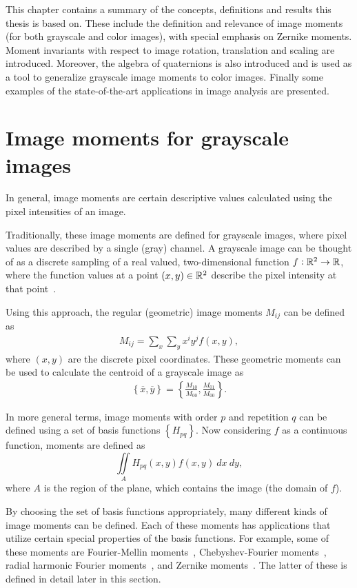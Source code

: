 This chapter contains a summary of the concepts, definitions and results this thesis is based on. These include the definition and relevance of image moments (for both grayscale and color images), with special emphasis on Zernike moments. Moment invariants with respect to image rotation, translation and scaling are introduced.
Moreover, the algebra of quaternions is also introduced and is used as a tool to generalize grayscale image moments to color images.
Finally some examples of the state-of-the-art applications in image analysis are presented.

\section{Image moments for grayscale images}\label{sec:grayscale}
In general, image moments are certain descriptive values calculated using the pixel intensities of an image. 

Traditionally, these image moments are defined for grayscale images, where pixel values are described by a single (gray) channel. A grayscale image can be thought of as a discrete sampling of a real valued, two-dimensional function $f : \mathbb{R}^2 \rightarrow \mathbb{R}$, where the function values at a point $(x,y) \in \mathbb{R}^2$ describe the pixel intensity at that point~\cite{moment_book}.

Using this approach, the regular (geometric) image moments $M_{ij}$ can be defined as
\begin{gather} \label{eq:regular_moment}
M_{ij} = \sum_x \sum_y x^iy^jf(x,y),
\end{gather} where $(x,y)$ are the discrete pixel coordinates.
These geometric moments can be used to calculate the centroid of a grayscale image as 
\begin{gather} \label{eq:centroid}
\left\{ \overline{x}, \overline{y} \right\} = \left\{ \frac{M_{10}}{M_{00}},  \frac{M_{01}}{M_{00}} \right\}.
\end{gather}

In more general terms, image moments with order $p$ and repetition $q$ can be defined using a set of basis functions $\left\{H_{pq}\right\}$. Now considering $f$ as a continuous function, moments are defined as
\begin{equation}\label{GeneralMoments}
\iint\limits_A H_{pq}(x,y)f(x,y)\ dx\ dy,
\end{equation} where $A$ is the region of the plane, which contains the image (the domain of $f$).

By choosing the set of basis functions appropriately, many different kinds of image moments can be defined. Each of these moments has applications that utilize certain special properties of the basis functions. For example, some of these moments are Fourier-Mellin moments~\cite{qfmm}, Chebyshev-Fourier moments~\cite{chebyshev-fourier}, radial harmonic Fourier moments~\cite{fourier}, and Zernike moments~\cite{zernike_moments}. The latter of these is defined in detail later in this section.

